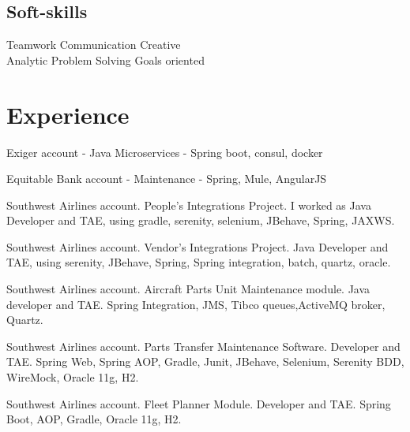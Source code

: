 \documentclass[]{deedy-resume-openfont}
\begin{document}
\begin{minipage}[t]{0.33\textwidth}
\subsection{Soft-skills}
Teamwork \textbullet{} Communication \textbullet{} Creative \\
Analytic \textbullet{} Problem Solving \textbullet{} Goals oriented  \\

\sectionsep

%
%

\end{minipage} 
\hfill
\begin{minipage}[t]{0.66\textwidth} 


\section{Experience}

\vspace{\topsep} %
\begin{tightemize}
\item Exiger account - Java Microservices - Spring boot, consul, docker
\item Equitable Bank account - Maintenance - Spring, Mule, AngularJS
\end{tightemize}
\sectionsep

\begin{tightemize}
\item Southwest Airlines account. People's Integrations Project. I worked as Java Developer and TAE, using gradle, serenity, selenium, JBehave, Spring, JAXWS. 
\item Southwest Airlines account. Vendor's Integrations Project. Java Developer and TAE, using serenity, JBehave, Spring, Spring integration, batch, quartz, oracle.  
\item Southwest Airlines account. Aircraft Parts Unit Maintenance module. Java developer and TAE. Spring Integration, JMS, Tibco queues,ActiveMQ broker, Quartz.
\item Southwest Airlines account. Parts Transfer Maintenance Software. Developer and TAE. Spring Web, Spring AOP, Gradle, Junit, JBehave, Selenium, Serenity BDD, WireMock, Oracle 11g, H2.
\item Southwest Airlines account. Fleet Planner Module. Developer and TAE. Spring Boot, AOP, Gradle, Oracle 11g, H2.\end{tightemize}
\sectionsep


\end{minipage}
\end{document}
